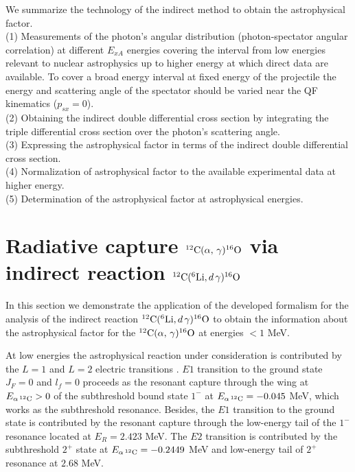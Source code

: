 \documentclass[prl,unsortedaddress,groupedaddress,twocolumn,amsmath,amsfonts,amssymb,showpacs,floatfix,nofootinbib]{revtex4}
\begin{document}
We summarize the technology of the indirect method to obtain the astrophysical factor.\\
(1) Measurements of the photon's angular distribution (photon-spectator angular correlation) at different $E_{xA}$ energies covering the interval from low energies relevant to nuclear astrophysics up to higher energy at which direct data are available. To cover a broad energy interval at fixed energy of the projectile the energy and scattering angle of the spectator should be varied near the QF kinematics ($p_{sx}=0$). \\
(2) Obtaining the indirect double differential cross section by integrating the triple differential cross section over the photon's scattering angle.\\
(3) Expressing the astrophysical factor in terms of the indirect double differential cross section.\\
(4) Normalization of astrophysical factor to the available experimental data at higher energy.\\
(5) Determination of the astrophysical factor at astrophysical energies. 
 
\section{Radiative capture ${}^{12}{\rm C}(\alpha,\,\gamma){}^{16}{\rm O}$ via  indirect reaction ${}^{12}{\rm C}({}^{6}{\rm Li},d\,\gamma){}^{16}{\rm O}$}

In this section we demonstrate the application of the developed formalism for the analysis
of the indirect reaction ${}^{12}{\rm C}({}^{6}{\rm Li},d\,\gamma){}^{16}{\rm O}$ to obtain the information about the astrophysical factor for the ${}^{12}{\rm C}(\alpha,\,\gamma){}^{16}{\rm O}$ at energies $< 1$ MeV. 

At low energies the astrophysical reaction under consideration is contributed by the $L=1$ and $L=2$ electric transitions \cite{barkerkajino,brune1999,kunz,assuncao,gai2015}. $E1$ transition to the ground state 
$J_{F}=0$ and $l_{f}=0$ proceeds as the resonant capture through the wing at $E_{\alpha\,{}^{12}{\rm C}}>0 $ of the subthreshold bound state $1^{-}$ at $E_{\alpha\,{}^{12}{\rm C}} = -0.045$ MeV, which works as the subthreshold resonance. Besides, the $E1$ transition to the ground state is contributed by the resonant capture through the low-energy tail of the $1^{-}$ resonance located at $E_{R}= 2.423$ MeV. The $E2$ transition is contributed by the subthreshold $2^{+}$ state at $E_{\alpha\,{}^{12}{\rm C}} = -0.2449$ MeV and low-energy tail of $2^{+}$ resonance at $2.68$ MeV.  
\end{document}
